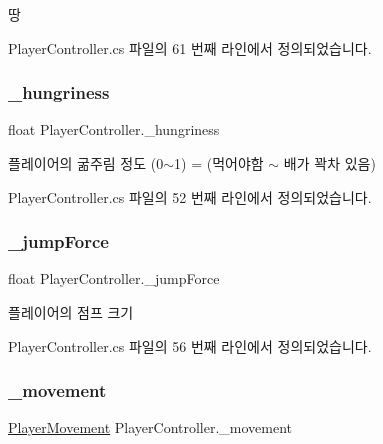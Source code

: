 땅 



Player\+Controller.\+cs 파일의 61 번째 라인에서 정의되었습니다.

\mbox{\label{class_player_controller_ab4fed78a016e8baca12e50bb3d7f034a}} 
\subsubsection{\texorpdfstring{\_hungriness}{\_hungriness}}
{\footnotesize\ttfamily float Player\+Controller.\+\_\+hungriness}



플레이어의 굶주림 정도 (0$\sim$1) = (먹어야함 $\sim$ 배가 꽉차 있음) 



Player\+Controller.\+cs 파일의 52 번째 라인에서 정의되었습니다.

\mbox{\label{class_player_controller_aaec5e4333fe1c532900ca666c075261c}} 
\subsubsection{\texorpdfstring{\_jumpForce}{\_jumpForce}}
{\footnotesize\ttfamily float Player\+Controller.\+\_\+jump\+Force\hspace{0.3cm}{\ttfamily [private]}}



플레이어의 점프 크기 



Player\+Controller.\+cs 파일의 56 번째 라인에서 정의되었습니다.

\mbox{\label{class_player_controller_ad788cfe2e37318d22d52010dc0fecd57}} 
\subsubsection{\texorpdfstring{\_movement}{\_movement}}
{\footnotesize\ttfamily \mbox{\hyperlink{class_player_movement}{Player\+Movement}} Player\+Controller.\+\_\+movement\hspace{0.3cm}{\ttfamily [private]}}



